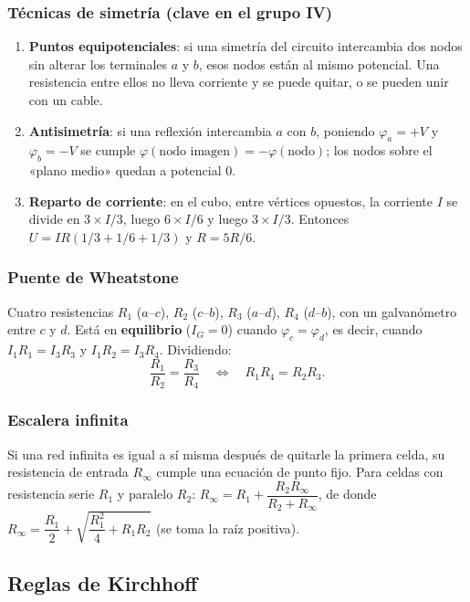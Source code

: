 \documentclass[11pt]{article}
\begin{document}
\subsubsection*{Técnicas de simetría (clave en el grupo IV)}
\begin{enumerate}
\item \textbf{Puntos equipotenciales}: si una simetría del circuito intercambia dos nodos sin alterar los terminales $a$ y $b$, esos nodos están al mismo potencial. Una resistencia entre ellos no lleva corriente y se puede quitar, o se pueden unir con un cable.
\item \textbf{Antisimetría}: si una reflexión intercambia $a$ con $b$, poniendo $\varphi_a=+V$ y $\varphi_b=-V$ se cumple $\varphi(\text{nodo imagen})=-\varphi(\text{nodo})$; los nodos sobre el «plano medio» quedan a potencial $0$.
\item \textbf{Reparto de corriente}: en el cubo, entre vértices opuestos, la corriente $I$ se divide en $3\times I/3$, luego $6\times I/6$ y luego $3\times I/3$. Entonces $U=IR(1/3+1/6+1/3)$ y $R=5R/6$.
\end{enumerate}

\subsubsection*{Puente de Wheatstone}
Cuatro resistencias $R_1$ ($a$--$c$), $R_2$ ($c$--$b$), $R_3$ ($a$--$d$), $R_4$ ($d$--$b$), con un galvanómetro entre $c$ y $d$. Está en \textbf{equilibrio} ($I_G=0$) cuando $\varphi_c=\varphi_d$, es decir, cuando $I_1R_1=I_3R_3$ y $I_1R_2=I_3R_4$. Dividiendo:
\[
\boxed{\frac{R_1}{R_2}=\frac{R_3}{R_4}}\quad\Longleftrightarrow\quad R_1R_4=R_2R_3.
\]

\subsubsection*{Escalera infinita}
Si una red infinita es igual a sí misma después de quitarle la primera celda, su resistencia de entrada $R_\infty$ cumple una ecuación de punto fijo. Para celdas con resistencia serie $R_1$ y paralelo $R_2$: $R_\infty=R_1+\dfrac{R_2R_\infty}{R_2+R_\infty}$, de donde $R_\infty=\dfrac{R_1}{2}+\sqrt{\dfrac{R_1^2}{4}+R_1R_2}$ (se toma la raíz positiva).

\subsection{Reglas de Kirchhoff}
\end{document}
